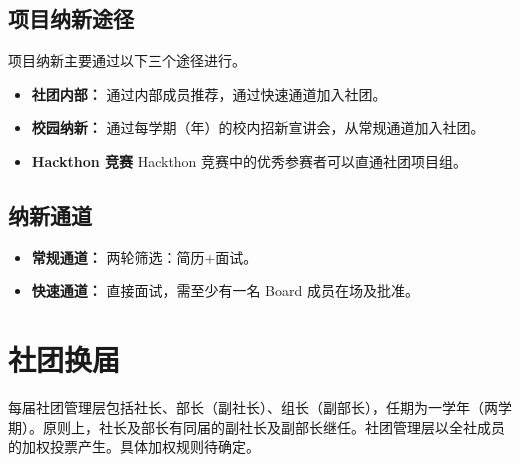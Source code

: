     \subsection{项目纳新途径}
    项目纳新主要通过以下三个途径进行。
    \begin{itemize}
        \item \textbf{社团内部：} 通过内部成员推荐，通过快速通道加入社团。
        \item \textbf{校园纳新：} 通过每学期（年）的校内招新宣讲会，从常规通道加入社团。
        \item \textbf{Hackthon 竞赛} Hackthon 竞赛中的优秀参赛者可以直通社团项目组。
    \end{itemize}


    \subsection{纳新通道}
    \begin{itemize}
        \item \textbf{常规通道：} 两轮筛选：简历+面试。
        \item \textbf{快速通道：} 直接面试，需至少有一名 Board 成员在场及批准。
    \end{itemize}



\section{社团换届}
每届社团管理层包括社长、部长（副社长）、组长（副部长），任期为一学年（两学期）。原则上，社长及部长有同届的副社长及副部长继任。社团管理层以全社成员的加权投票产生。具体加权规则待确定。
